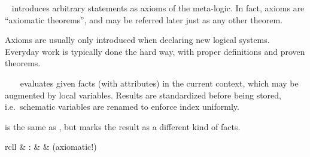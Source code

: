 \begin{isabellebody}
\begin{isamarkuptext}
  \begin{description}
  
  \item \hyperlink{command.axioms}{\mbox{}}~ introduces arbitrary
  statements as axioms of the meta-logic.  In fact, axioms are
  ``axiomatic theorems'', and may be referred later just as any other
  theorem.
  
  Axioms are usually only introduced when declaring new logical
  systems.  Everyday work is typically done the hard way, with proper
  definitions and proven theorems.
  
  \item \hyperlink{command.lemmas}{\mbox{}}~~\hypertarget{keyword.for}{\hyperlink{keyword.for}{\mbox{}}}~ evaluates given facts (with attributes) in
  the current context, which may be augmented by local variables.
  Results are standardized before being stored, i.e.\ schematic
  variables are renamed to enforce index  uniformly.

  \item \hyperlink{command.theorems}{\mbox{}} is the same as \hyperlink{command.lemmas}{\mbox{}}, but
  marks the result as a different kind of facts.

  \end{description}%
\end{isamarkuptext}%
\isamarkuptrue%
%
\isamarkuptrue%
%
\begin{isamarkuptext}%
\begin{matharray}{rcll}
    \hypertarget{command.oracle}{\hyperlink{command.oracle}{\mbox{}}} & : &  & (axiomatic!) \\
  \end{matharray}


\end{isamarkuptext}
\end{isabellebody}
